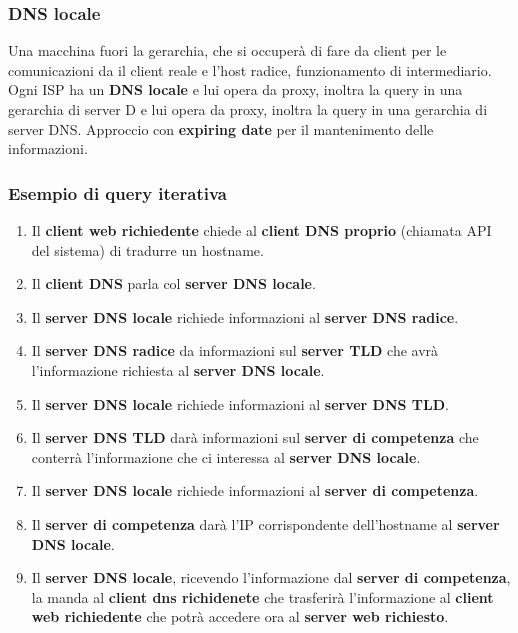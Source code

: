 \subsubsection{DNS locale}
Una macchina fuori la gerarchia, che si occuperà di fare da client per le comunicazioni da il client reale e l'host radice, funzionamento di intermediario.
Ogni ISP ha un \textbf{DNS locale} e lui opera da proxy, inoltra la query in una gerarchia di server D e lui opera da proxy, inoltra la query in una gerarchia di server DNS.
Approccio con \textbf{expiring date} per il mantenimento delle informazioni.

\subsubsection*{Esempio di query iterativa}
\begin{enumerate}
\item Il \textbf{client web richiedente} chiede al \textbf{client DNS proprio} (chiamata API del sistema) di tradurre un hostname.
\item Il \textbf{client DNS} parla col \textbf{server DNS locale}.
\item Il \textbf{server DNS locale} richiede informazioni al \textbf{server DNS radice}. 
\item Il \textbf{server DNS radice} da informazioni sul \textbf{server TLD} che avrà l'informazione richiesta al \textbf{server DNS locale}.
\item Il \textbf{server DNS locale} richiede informazioni al \textbf{server DNS TLD}. 
\item Il \textbf{server DNS TLD} darà informazioni sul \textbf{server di competenza} che conterrà l'informazione che ci interessa al \textbf{server DNS locale}. 
\item Il \textbf{server DNS locale} richiede informazioni al \textbf{server di competenza}. 
\item Il \textbf{server di competenza} darà l'IP corrispondente dell'hostname al \textbf{server DNS locale}.
\item Il \textbf{server DNS locale}, ricevendo l'informazione dal \textbf{server di competenza}, la manda al \textbf{client dns richidenete} che trasferirà l'informazione al \textbf{client web richiedente} che potrà accedere ora al \textbf{server web richiesto}.
\end{enumerate}

